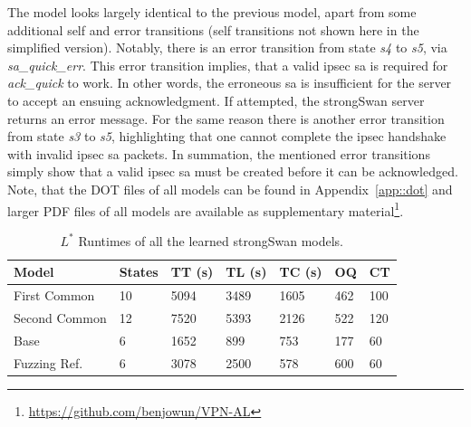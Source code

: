 The model looks largely identical to the previous model, apart from some additional self and error transitions (self transitions not shown here in the simplified version). Notably, there is an error transition from state \emph{s4} to \emph{s5}, via \emph{sa\_quick\_err}. This error transition implies, that a valid \ac{ipsec} \ac{sa} is required for \emph{ack\_quick} to work. In other words, the erroneous \ac{sa} is insufficient for the server to accept an ensuing acknowledgment. If attempted, the strongSwan server returns an error message. For the same reason there is another error transition from state \emph{s3} to \emph{s5}, highlighting that one cannot complete the \ac{ipsec} handshake with invalid \ac{ipsec} \ac{sa} packets. In summation, the mentioned error transitions simply show that a valid \ac{ipsec} \ac{sa} must be created before it can be acknowledged. Note, that the DOT files of all models can be found in Appendix~\ref{app::dot} and larger PDF files of all models are available as supplementary material\footnote{\url{https://github.com/benjowun/VPN-AL}}.
\vspace{3mm}
\begin{table}[H]
	\centering
	\begin{tabular}{|l|l|l|l|l|l|l|}
		\hline
		\rowcolor[HTML]{C0C0C0} 
		Model     & States & TT (s)   & TL (s)   & TC (s)   & OQ  & CT  \\ \hline
		First Common  & 10     & 5094 & 3489 & 1605 & 462 & 100 \\ \hline
		Second Common  & 12     & 7520 & 5393 & 2126 & 522 & 120 \\ \hline
		Base      & 6      & 1652 & 899  & 753  & 177 & 60  \\ \hline
		Fuzzing Ref. & 6      & 3078 & 2500 & 578  & 600 & 60  \\ \hline
	\end{tabular}
	\caption{$L^*$ Runtimes of all the learned strongSwan models.}
	\label{tab:runtime_summary_lstar}
\end{table}
\vspace{3mm}

